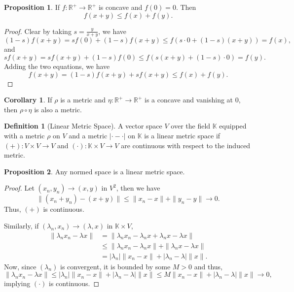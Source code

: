 \documentclass[]{article}
\theoremstyle{definition}
\theoremstyle{definition}
\newtheorem{definition}{Definition}[section]
\newtheorem{proposition}{Proposition}[section]
\newtheorem{corollary}{Corollary}[section]
\begin{document}
\begin{proposition}
  If \(f : \mathbb{R}^+ \to \mathbb{R}^+\) is concave and \(f(0) = 0\). Then 
  \[f(x + y) \le f(x) + f(y).\]
\end{proposition}
\begin{proof}
  Clear by taking \(s = \frac{y}{x + y}\), we have 
  \[(1 - s)f(x + y) = s f(0) + (1 - s)f(x + y) \le f(s \cdot 0 + (1 - s)(x + y))
    = f(x),\]
  and 
  \[sf(x + y) = sf(x + y) + (1 - s)f(0) \le f(s(x + y) + (1 - s) \cdot 0) = 
    f(y).\]
  Adding the two equations, we have
  \[f(x + y) = (1 - s)f(x + y) + sf(x + y) \le f(x) + f(y).\]
\end{proof}

\begin{corollary}
  If \(\rho\) is a metric and \(\eta : \mathbb{R}^+ \to \mathbb{R}^+\) is a 
  concave and vanishing at \(0\), then \(\rho \circ \eta\) is also a metric.
\end{corollary}

\begin{definition}[Linear Metric Space]
  A vector space \(V\) over the field \(\mathbb{K}\) equipped with a metric 
  \(\rho\) on \(V\) and a metric \(|\cdot - \cdot|\) on \(\mathbb{K}\) is a 
  linear metric space if \((+) : V \times V \to V\) and 
  \((\cdot) : \mathbb{K} \times V \to V\) are continuous with respect to the 
  induced metric.
\end{definition}

\begin{proposition}
  Any normed space is a linear metric space.
\end{proposition}
\begin{proof}
  Let \((x_n, y_n) \to (x, y)\) in \(V^2\), then we have 
  \[\|(x_n + y_n) - (x + y)\| \le \|x_n - x\| + \|y_n - y\| \to 0.\]
  Thus, \((+)\) is continuous. 
  
  Similarly, if \((\lambda_n, x_n) \to (\lambda, x)\) in \(\mathbb{K} \times V\),
  \[\begin{split}
    \|\lambda_n x_n - \lambda x\| 
      & = \|\lambda_n x_n - \lambda_n x + \lambda_n x - \lambda x\| \\
      & \le \|\lambda_n x_n - \lambda_n x\| + \|\lambda_n x - \lambda x\| \\
      & = |\lambda_n| \|x_n - x\| + |\lambda_n - \lambda| \|x\|.
  \end{split}\]
  Now, since \((\lambda_n)\) is convergent, it is bounded by some \(M > 0\) and 
  thus, 
  \[\|\lambda_n x_n - \lambda x\| 
    \le |\lambda_n| \|x_n - x\| + |\lambda_n - \lambda| \|x\|
    \le M \|x_n - x\| + |\lambda_n - \lambda| \|x\| \to 0,\]
  implying \((\cdot)\) is continuous.
\end{proof}
\end{document}
